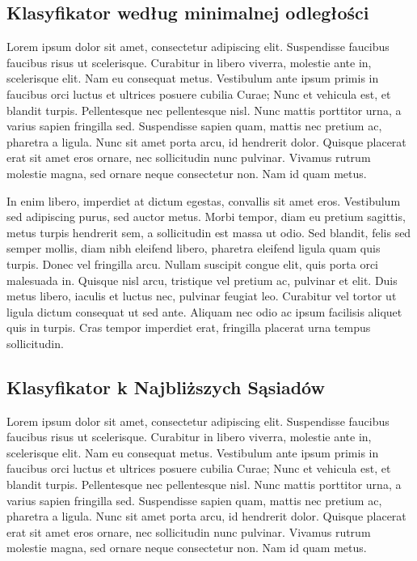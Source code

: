 	\subsection{Klasyfikator według minimalnej odległości}
	Lorem ipsum dolor sit amet, consectetur adipiscing elit. Suspendisse faucibus faucibus risus ut scelerisque. Curabitur in libero viverra, molestie ante in, scelerisque elit. Nam eu consequat metus. Vestibulum ante ipsum primis in faucibus orci luctus et ultrices posuere cubilia Curae; Nunc et vehicula est, et blandit turpis. Pellentesque nec pellentesque nisl. Nunc mattis porttitor urna, a varius sapien fringilla sed. Suspendisse sapien quam, mattis nec pretium ac, pharetra a ligula. Nunc sit amet porta arcu, id hendrerit dolor. Quisque placerat erat sit amet eros ornare, nec sollicitudin nunc pulvinar. Vivamus rutrum molestie magna, sed ornare neque consectetur non. Nam id quam metus.

	In enim libero, imperdiet at dictum egestas, convallis sit amet eros. Vestibulum sed adipiscing purus, sed auctor metus. Morbi tempor, diam eu pretium sagittis, metus turpis hendrerit sem, a sollicitudin est massa ut odio. Sed blandit, felis sed semper mollis, diam nibh eleifend libero, pharetra eleifend ligula quam quis turpis. Donec vel fringilla arcu. Nullam suscipit congue elit, quis porta orci malesuada in. Quisque nisl arcu, tristique vel pretium ac, pulvinar et elit. Duis metus libero, iaculis et luctus nec, pulvinar feugiat leo. Curabitur vel tortor ut ligula dictum consequat ut sed ante. Aliquam nec odio ac ipsum facilisis aliquet quis in turpis. Cras tempor imperdiet erat, fringilla placerat urna tempus sollicitudin.
	
	\subsection{Klasyfikator k Najbliższych Sąsiadów}
	Lorem ipsum dolor sit amet, consectetur adipiscing elit. Suspendisse faucibus faucibus risus ut scelerisque. Curabitur in libero viverra, molestie ante in, scelerisque elit. Nam eu consequat metus. Vestibulum ante ipsum primis in faucibus orci luctus et ultrices posuere cubilia Curae; Nunc et vehicula est, et blandit turpis. Pellentesque nec pellentesque nisl. Nunc mattis porttitor urna, a varius sapien fringilla sed. Suspendisse sapien quam, mattis nec pretium ac, pharetra a ligula. Nunc sit amet porta arcu, id hendrerit dolor. Quisque placerat erat sit amet eros ornare, nec sollicitudin nunc pulvinar. Vivamus rutrum molestie magna, sed ornare neque consectetur non. Nam id quam metus.

